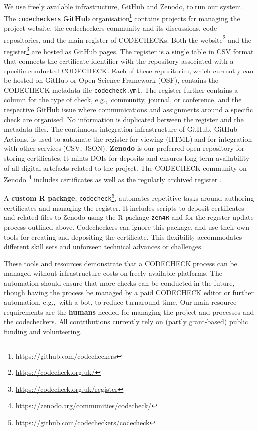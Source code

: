 \documentclass[12pt]{article}
\begin{document}
We use freely available infrastructure, GitHub and Zenodo, to run our
system.  The \texttt{codecheckers} \textbf{GitHub}
organisation\footnote{ \url{https://github.com/codecheckers}} contains
projects for managing the project website, the codecheckers community
and its discussions, code repositories, and the main register of
CODECHECKs. Both the website\footnote{
  \url{https://codecheck.org.uk/}} and the register\footnote{
  \url{https://codecheck.org.uk/register}} are hosted as GitHub
pages. The register is a single table in CSV format that connects the
certificate identifier with the repository associated with a specific
conducted CODECHECK. Each of these repositories, which currently can
be hosted on GitHub or Open Science Framework (OSF), contains the
CODECHECK metadata file \texttt{codecheck.yml}. The register further
contains a column for the type of check, e.g.,~community, journal, or
conference, and the respective GitHub issue where communications and
assignments around a specific check are organised. No information is
duplicated between the register and the metadata files. The continuous
integration infrastructure of GitHub, GitHub Actions, is used to
automate the register for viewing (HTML) and for integration with
other services (CSV, JSON).  \textbf{Zenodo} is our preferred open repository for
storing certificates. It mints DOIs for deposits and ensures
long-term availability of all digital artefacts related to the
project. The CODECHECK community on Zenodo
\footnote{\url{https://zenodo.org/communities/codecheck/}} includes
certificates as well as the regularly archived register
\cite{codecheck_register_jan2021}.

A \textbf{custom R package}, \texttt{codecheck}\footnote{
  \url{https://github.com/codecheckers/codecheck}}, automates
repetitive tasks around authoring certificates and managing the
register.  It includes scripts to deposit certificates and related
files to Zenodo using the R package \texttt{zen4R} \cite{zen4r} and
for the register update process outlined above.  Codecheckers can
ignore this package, and use their own tools for creating
and depositing the certificate.  This flexibility  accommodates
different skill sets and unforseen technical advances or challenges.

These tools and resources demonstrate that a CODECHECK process can be
managed without infrastructure costs on freely available platforms.
The automation should ensure that more checks can be conducted in the
future, though having the process be managed by a paid CODECHECK
editor or further automation, e.g.,~with a bot, to reduce turnaround
time. Our main resource requirements are the \textbf{humans} needed for managing
the project and processes and the codecheckers.  All contributions
currently rely on (partly grant-based) public funding and
volunteering.
\end{document}
